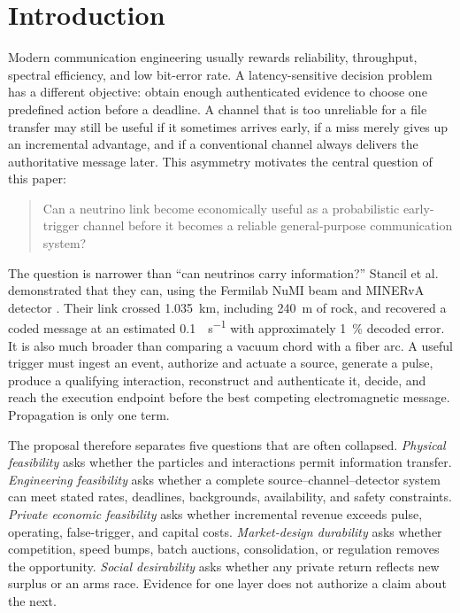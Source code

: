 \documentclass[11pt]{article}
\begin{document}
\section{Introduction}

Modern communication engineering usually rewards reliability, throughput, spectral efficiency, and low bit-error rate. A latency-sensitive decision problem has a different objective: obtain enough authenticated evidence to choose one predefined action before a deadline. A channel that is too unreliable for a file transfer may still be useful if it sometimes arrives early, if a miss merely gives up an incremental advantage, and if a conventional channel always delivers the authoritative message later. This asymmetry motivates the central question of this paper:

\begin{quote}
Can a neutrino link become economically useful as a probabilistic early-trigger channel before it becomes a reliable general-purpose communication system?
\end{quote}

The question is narrower than ``can neutrinos carry information?'' Stancil et al. demonstrated that they can, using the Fermilab NuMI beam and MINERvA detector \citep{Stancil2012}. Their link crossed \SI{1.035}{\kilo\metre}, including \SI{240}{\metre} of rock, and recovered a coded message at an estimated \SI{0.1}{\bit\per\second} with approximately \SI{1}{\percent} decoded error. It is also much broader than comparing a vacuum chord with a fiber arc. A useful trigger must ingest an event, authorize and actuate a source, generate a pulse, produce a qualifying interaction, reconstruct and authenticate it, decide, and reach the execution endpoint before the best competing electromagnetic message. Propagation is only one term.

The proposal therefore separates five questions that are often collapsed. \emph{Physical feasibility} asks whether the particles and interactions permit information transfer. \emph{Engineering feasibility} asks whether a complete source--channel--detector system can meet stated rates, deadlines, backgrounds, availability, and safety constraints. \emph{Private economic feasibility} asks whether incremental revenue exceeds pulse, operating, false-trigger, and capital costs. \emph{Market-design durability} asks whether competition, speed bumps, batch auctions, consolidation, or regulation removes the opportunity. \emph{Social desirability} asks whether any private return reflects new surplus or an arms race. Evidence for one layer does not authorize a claim about the next.
\end{document}
